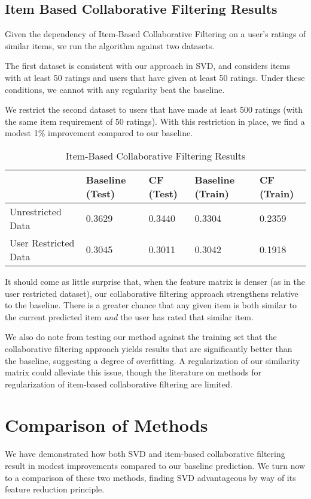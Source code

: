 \documentclass[12pt]{article}
\begin{document}
\subsection*{Item Based Collaborative Filtering Results}

Given the dependency of Item-Based Collaborative Filtering on a user's ratings of similar items, we run the algorithm against two datasets.

The first dataset is consistent with our approach in SVD, and considers items with at least 50 ratings and users that have given at least 50 ratings. Under these conditions, we cannot with any regularity beat the baseline.

We restrict the second dataset to users that have made at least 500 ratings (with the same item requirement of 50 ratings). With this restriction in place, we find a modest 1\% improvement compared to our baseline.


\begin{table}[ht!]
\centering
\caption{Item-Based Collaborative Filtering Results}
\label{my-label}
\begin{tabular}{lllll}
\hline
                        & Baseline (Test) & CF (Test) & Baseline (Train) & CF (Train) \\ \hline
Unrestricted Data     & 0.3629             & 0.3440                  & 0.3304              & 0.2359                   \\
User Restricted Data  & 0.3045             & 0.3011                  & 0.3042              & 0.1918                   \\ \hline
\end{tabular}
\end{table}

It should come as little surprise that, when the feature matrix is denser (as in the user restricted dataset), our collaborative filtering approach strengthens relative to the baseline. There is a greater chance that any given item is both similar to the current predicted item \textit{and} the user has rated that similar item.

We also do note from testing our method against the training set that the collaborative filtering approach yields results that are significantly better than the baseline, suggesting a degree of overfitting. A regularization of our similarity matrix could alleviate this issue, though the literature on methods for regularization of item-based collaborative filtering are limited.

\section{Comparison of Methods}
We have demonstrated how both SVD and item-based collaborative filtering result in modest improvements compared to our baseline prediction. We turn now to a comparison of these two methods, finding SVD advantageous by way of its feature reduction principle.
\end{document}
